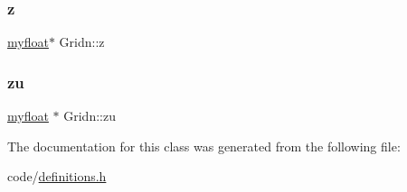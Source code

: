 \subsubsection{\texorpdfstring{z}{z}}
{\footnotesize\ttfamily \hyperlink{param_8h_a5f097c9f3873af7be7fc156e6a06ca5e}{myfloat}$\ast$ Gridn\+::z}

\mbox{\label{classGridn_a1116eb6bd06272d2ba159feda86c712c}} 
\subsubsection{\texorpdfstring{zu}{zu}}
{\footnotesize\ttfamily \hyperlink{param_8h_a5f097c9f3873af7be7fc156e6a06ca5e}{myfloat} $\ast$ Gridn\+::zu}



The documentation for this class was generated from the following file\+:\begin{DoxyCompactItemize}
\item 
code/\hyperlink{definitions_8h}{definitions.\+h}\end{DoxyCompactItemize}
